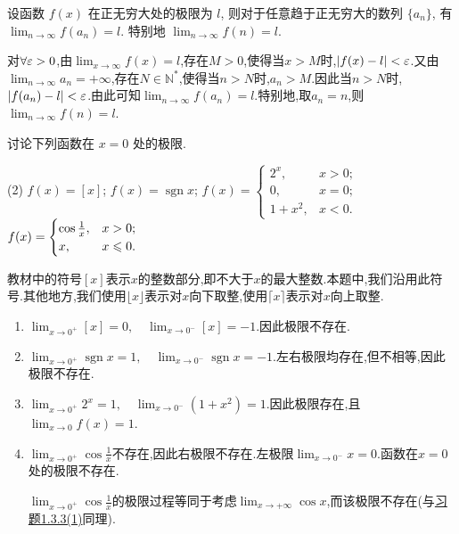 \begin{exercise}[1.3.4]
    设函数 $f(x)$ 在正无穷大处的极限为 $l$, 则对于任意趋于正无穷大的数列 $\{a_n\}$, 有 $\lim_{n \to \infty} f(a_n) = l$. 特别地 $\lim_{n \to \infty} f(n) = l$.
\end{exercise}

\begin{solution}
    [无穷版本的Heine定理 \ 解]对$\forall \varepsilon > 0$,由$\lim_{x \to \infty} f(x) = l$,存在$M > 0$,使得当$x > M$时,$|f(x) - l| < \varepsilon$.又由$\lim_{n \to \infty} a_n = +\infty$,存在$N\in \mathbb{N}^*$,使得当$n > N$时,$a_n > M$.因此当$n > N$时,$|f(a_n) - l| < \varepsilon$.由此可知$\lim_{n \to \infty} f(a_n) = l$.特别地,取$a_n = n$,则$\lim_{n \to \infty} f(n) = l$.
\end{solution}

\begin{exercise}[1.3.5]
    讨论下列函数在 $x=0$ 处的极限.
    \begin{tasks}[label=(\arabic*)](2)
        \task $f(x) = [x]$;
        \task $f(x) = \operatorname{sgn} x$;
        \task $f(x) = \begin{cases} 2^x, & x > 0; \\ 0, & x = 0; \\ 1+x^2, & x < 0. \end{cases}$
        \task $f(x) = \begin{cases} \cos\frac{1}{x}, & x > 0; \\ x, & x \leqslant 0. \end{cases}$
    \end{tasks}
\end{exercise}

\begin{solution}
    \begin{remark}
        教材中的符号$[x]$表示$x$的整数部分,即不大于$x$的最大整数.本题中,我们沿用此符号.其他地方,我们使用$\lfloor x \rfloor$表示对$x$向下取整,使用$\lceil x \rceil$表示对$x$向上取整.
    \end{remark}
    \begin{enumerate}[(1)]
        \item $\lim_{x \to 0^+} [x] = 0, \quad \lim_{x \to 0^-} [x] = -1$.因此极限不存在.
        \item $\lim_{x \to 0^+} \operatorname{sgn} x = 1, \quad \lim_{x \to 0^-} \operatorname{sgn} x = -1$.左右极限均存在,但不相等,因此极限不存在.
        \item $\lim_{x \to 0^+} 2^x = 1, \quad \lim_{x \to 0^-} (1+x^2) = 1$.因此极限存在,且$\lim_{x \to 0} f(x) = 1$.
        \item $\lim_{x \to 0^+} \cos\frac{1}{x}$不存在,因此右极限不存在.左极限$\lim_{x \to 0^-} x = 0$.函数在$x=0$处的极限不存在. \begin{remark}
                  $\lim_{x \to 0^+} \cos \frac{1}{x}$的极限过程等同于考虑$\lim_{x \to + \infty} \cos x$,而该极限不存在(与\hyperref[exe:1.3.3]{习题1.3.3(1)}同理).
              \end{remark}
    \end{enumerate}
\end{solution}

